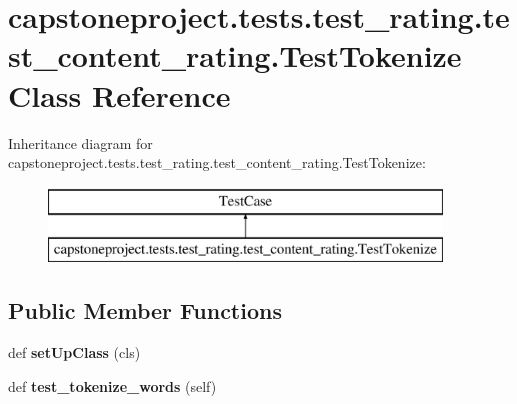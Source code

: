 \hypertarget{classcapstoneproject_1_1tests_1_1test__rating_1_1test__content__rating_1_1_test_tokenize}{}\section{capstoneproject.\+tests.\+test\+\_\+rating.\+test\+\_\+content\+\_\+rating.\+Test\+Tokenize Class Reference}
\label{classcapstoneproject_1_1tests_1_1test__rating_1_1test__content__rating_1_1_test_tokenize}
Inheritance diagram for capstoneproject.\+tests.\+test\+\_\+rating.\+test\+\_\+content\+\_\+rating.\+Test\+Tokenize\+:\begin{figure}[H]
\begin{center}
\leavevmode
\includegraphics[height=2.000000cm]{classcapstoneproject_1_1tests_1_1test__rating_1_1test__content__rating_1_1_test_tokenize}
\end{center}
\end{figure}
\subsection*{Public Member Functions}
\begin{DoxyCompactItemize}
\item 
\mbox{\label{classcapstoneproject_1_1tests_1_1test__rating_1_1test__content__rating_1_1_test_tokenize_a6faec4fdffcc2c3173d2b9c012f5a21f}} 
def {\bfseries set\+Up\+Class} (cls)
\item 
\mbox{\label{classcapstoneproject_1_1tests_1_1test__rating_1_1test__content__rating_1_1_test_tokenize_a177464852e4928331c9b474768e433d5}} 
def {\bfseries test\+\_\+tokenize\+\_\+words} (self)
\end{DoxyCompactItemize}
